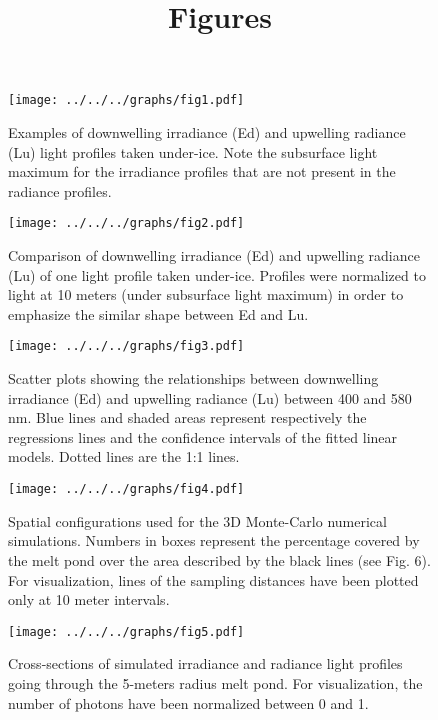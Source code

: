 \documentclass[12pt,a4paper]{scrartcl}
\title{Figures}
\date{}
\begin{document}
\maketitle

\begin{figure}[ht]
	\centering
	\texttt{[image: ../../../graphs/fig1.pdf]}
	\caption{Examples of downwelling irradiance (Ed) and upwelling radiance (Lu) light profiles taken under-ice. Note the subsurface light maximum for the irradiance profiles that are not present in the radiance profiles.}
\end{figure}

\clearpage
\newpage

\begin{figure}[ht]
	\centering
	\texttt{[image: ../../../graphs/fig2.pdf]}
	\caption{Comparison of downwelling irradiance (Ed) and upwelling radiance (Lu) of one light profile taken under-ice. Profiles were normalized to light at 10 meters (under subsurface light maximum) in order to emphasize the similar shape between Ed and Lu.}
\end{figure}

\clearpage
\newpage

\begin{figure}[ht]
	\centering
	\texttt{[image: ../../../graphs/fig3.pdf]}
	\caption{Scatter plots showing the relationships between downwelling irradiance (Ed) and upwelling radiance (Lu) between 400 and 580 nm. Blue lines and shaded areas represent respectively the regressions lines and the confidence intervals of the fitted linear models. Dotted lines are the 1:1 lines.}
\end{figure}

\clearpage
\newpage

\begin{figure}[ht]
	\centering
	\texttt{[image: ../../../graphs/fig4.pdf]}
	\caption{Spatial configurations used for the 3D Monte-Carlo numerical simulations. Numbers in boxes represent the percentage covered by the melt pond over the area described by the black lines (see Fig. 6). For visualization, lines of the sampling distances have been plotted only at 10 meter intervals.}
\end{figure}

\clearpage
\newpage

\begin{figure}[ht]
	\centering
	\texttt{[image: ../../../graphs/fig5.pdf]}
	\caption{Cross-sections of simulated irradiance and radiance light profiles going through the 5-meters radius melt pond. For visualization, the number of photons have been normalized between 0 and 1.}
\end{figure}
\end{document}
